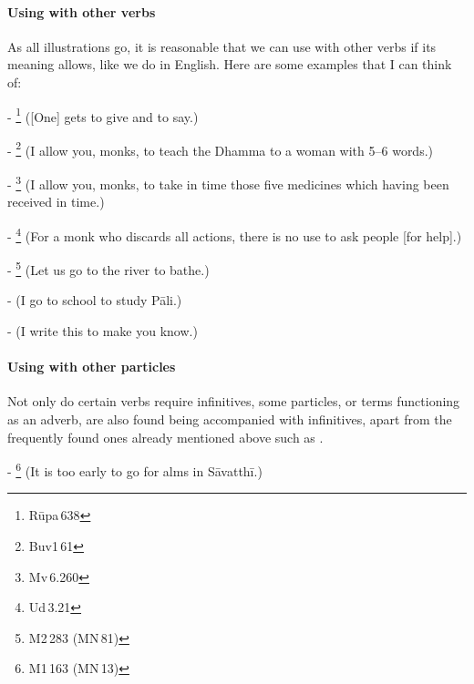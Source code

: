 \paragraph*{Using with other verbs} As all illustrations go, it is reasonable that we can use  with other verbs if its meaning allows, like we do in English. Here are some examples that I can think of:\par
- \footnote{R\=upa\,638} ([One] gets to give and to say.)\par
- \footnote{Buv1\,61} (I allow you, monks, to teach the Dhamma to a woman with 5--6 words.)\par
- \footnote{Mv\,6.260} (I allow you, monks, to take in time those five medicines which having been received in time.)\par
- \footnote{Ud\,3.21} (For a monk who discards all actions, there is no use to ask people [for help].)\par
- \footnote{M2\,283 (MN\,81)} (Let us go to the river to bathe.)\par
-  (I go to school to study P\=ali.)\par
-  (I write this to make you know.)\par

\paragraph*{Using with other particles} Not only do certain verbs require infinitives, some particles, or terms functioning as an adverb, are also found being accompanied with infinitives, apart from the frequently found ones already mentioned above such as .\par
- \footnote{M1\,163 (MN\,13)} (It is too early to go for alms in S\=avatth\=i.)\par

